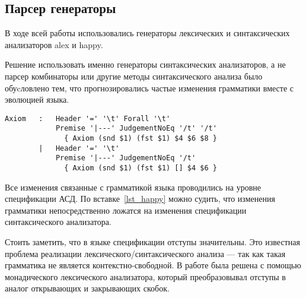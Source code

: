 \subsection{Парсер генераторы}
В ходе всей работы использовались генераторы лексических и синтаксических анализаторов alex\cite{alex} и happy\cite{happy}.

Решение использовать именно генераторы синтаксических анализаторов, а не парсер комбинаторы\cite{parsec} или другие методы синтаксического анализа было обуcловлено тем, что прогнозировались частые изменения грамматики вместе с эволюцией языка.

\begin{lstlisting}[caption={Часть спецификации синтаксического анализатора},captionpos=b, frame=single, label={lst_happy}]
Axiom   :   Header '=' '\t' Forall '\t'
            Premise '|---' JudgementNoEq '/t' '/t'
              { Axiom (snd $1) (fst $1) $4 $6 $8 }
        |   Header '=' '\t'
            Premise '|---' JudgementNoEq '/t'
              { Axiom (snd $1) (fst $1) [] $4 $6 }
\end{lstlisting}

Все изменения связанные с грамматикой языка проводились на уровне спецификации АСД. По вставке~\ref{lst_happy} можно судить, что изменения грамматики непосредственно ложатся на изменения спецификации синтаксического анализатора.

\hfill

Стоить заметить, что в языке спецификации отступы значительны. Это известная проблема реализации лексического/синтаксического анализа --- так как такая грамматика не является контекстно-свободной. В работе была решена с помощью монадического лексического анализатора, который преобразовывал отступы в аналог открывающих и закрывающих скобок.

